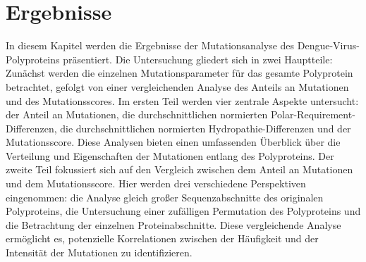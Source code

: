 \documentclass[german,version-2022-01]{uzl-thesis}
\begin{document}
\chapter{Ergebnisse}
In diesem Kapitel werden die Ergebnisse der Mutationsanalyse des Dengue-Virus-Polyproteins pr\"asentiert. Die Untersuchung gliedert sich in zwei Hauptteile: Zun\"achst werden die einzelnen Mutationsparameter f\"ur das gesamte Polyprotein betrachtet, gefolgt von einer vergleichenden Analyse des Anteils an Mutationen und des Mutationsscores. Im ersten Teil werden vier zentrale Aspekte untersucht: der Anteil an Mutationen, die durchschnittlichen normierten Polar-Requirement-Differenzen, die durchschnittlichen normierten Hydropathie-Differenzen und der Mutationsscore. Diese Analysen bieten einen umfassenden \"Uberblick \"uber die Verteilung und Eigenschaften der Mutationen entlang des Polyproteins. Der zweite Teil fokussiert sich auf den Vergleich zwischen dem Anteil an Mutationen und dem Mutationsscore. Hier werden drei verschiedene Perspektiven eingenommen: die Analyse gleich gro\ss{}er Sequenzabschnitte des originalen Polyproteins, die Untersuchung einer zuf\"alligen Permutation des Polyproteins und die Betrachtung der einzelnen Proteinabschnitte. Diese vergleichende Analyse erm\"oglicht es, potenzielle Korrelationen zwischen der H\"aufigkeit und der Intensit\"at der Mutationen zu identifizieren.
\end{document}
